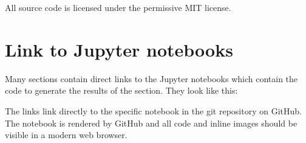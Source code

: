 All source code is licensed under the permissive MIT license.

\section{Link to Jupyter notebooks}
Many sections contain direct links to the Jupyter notebooks which contain the code to generate the results of the section. They look like this:


The links link directly to the specific notebook in the git repository on GitHub. The notebook is rendered by GitHub and all code and inline images should be visible in a modern web browser.